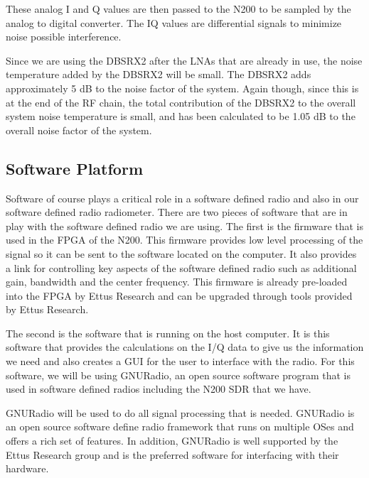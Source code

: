 
These analog I and Q values are then passed to the N200 to be sampled by the analog to digital converter.  The IQ values are differential signals to minimize noise possible interference.

Since we are using the DBSRX2 after the LNAs that are already in use, the noise temperature added by the DBSRX2 will be small.  The DBSRX2 adds approximately 5 dB to the noise factor of the system.  Again though, since this is at the end of the RF chain, the total contribution of the DBSRX2 to the overall system noise temperature is small, and has been calculated to be 1.05 dB to the overall noise factor of the system.

\subsection{Software Platform} 

Software of course plays a critical role in a software defined radio and also in our software defined radio radiometer.  There are two pieces of software that are in play with the software defined radio we are using.  The first is the firmware that is used in the FPGA of the N200.  This firmware provides low level processing of the signal so it can be sent to the software located on the computer.  It also provides a link for controlling key aspects of the software defined radio such as additional gain, bandwidth and the center frequency.  This firmware is already pre-loaded into the FPGA by Ettus Research and can be upgraded through tools provided by Ettus Research.

The second is the software that is running on the host computer.  It is this software that provides the calculations on the I/Q data to give us the information we need and also creates a GUI for the user to interface with the radio.  For this software, we will be using GNURadio, an open source software program that is used in software defined radios including the N200 SDR that we have.  

GNURadio will be used to do all signal processing that is needed.  GNURadio is an open source software define radio framework that runs on multiple OSes and offers a rich set of features.  In addition, GNURadio is well supported by the Ettus Research group and is the preferred software for interfacing with their hardware.  

